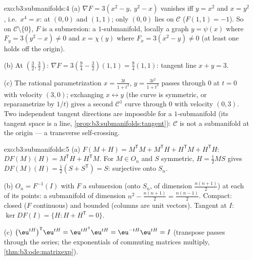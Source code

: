 \begin{solution}{exo:b3:submanifolds:4}
(a) $\nabla F = 3(x^2 - y,\ y^2 - x)$ vanishes iff $y = x^2$
and $x = y^2$, i.e.\ $x^4 = x$: at $(0,0)$ and $(1,1)$; only
$(0,0)$ lies on $\mathcal C$ ($F(1,1) = -1$). So on $\mathcal
C\setminus\{0\}$, $F$ is a submersion: a $1$-submanifold,
locally a graph $y = \psi(x)$ where $F_y = 3(y^2 - x) \neq 0$
and $x = \chi(y)$ where $F_x = 3(x^2 - y) \neq 0$ (at least
one holds off the origin).

(b) At $(\frac32, \frac32)$: $\nabla F = 3(\frac94 - \frac32)
(1, 1) = \frac94(1,1)$: tangent line $x + y = 3$.

(c) The rational parametrization $x = \frac{3t}{1 + t^3}$,
$y = \frac{3t^2}{1+t^3}$ passes through $0$ at $t = 0$ with
velocity $(3, 0)$; exchanging $x \leftrightarrow y$ (the
curve is symmetric, or reparametrize by $1/t$) gives a second
$\mathcal C^1$ curve through $0$ with velocity $(0, 3)$. Two
independent tangent directions are impossible for a
$1$-submanifold (its tangent space is a line,
\cref{prop:b3:submanifolds:tangent}): $\mathcal C$ is not a
submanifold at the origin --- a transverse self-crossing.
\end{solution}

\begin{solution}{exo:b3:submanifolds:5}
(a) $F(M + H) = M^{\mathsf T}M + M^{\mathsf T}H + H^{\mathsf
T}M + H^{\mathsf T}H$: $DF(M)(H) = M^{\mathsf T}H +
H^{\mathsf T}M$. For $M \in O_n$ and $S$ symmetric, $H =
\frac12MS$ gives $DF(M)(H) = \frac12(S + S^{\mathsf T}) = S$:
surjective onto $S_n$.

(b) $O_n = F^{-1}(I)$ with $F$ a submersion (onto $S_n$, of
dimension $\frac{n(n+1)}2$) at each of its points:
a submanifold of dimension $n^2 - \frac{n(n+1)}2 =
\frac{n(n-1)}2$. Compact: closed ($F$ continuous) and bounded
(columns are unit vectors). Tangent at $I$: $\ker DF(I) =
\{H : H + H^{\mathsf T} = 0\}$.

(c) $\bigl(\eu^{tH}\bigr)^{\mathsf T}\eu^{tH} =
\eu^{tH^{\mathsf T}}\eu^{tH} = \eu^{-tH}\eu^{tH} = I$
(transpose passes through the series; the exponentials of
commuting matrices multiply,
\cref{thm:b3:ode:matrixexp}).
\end{solution}

